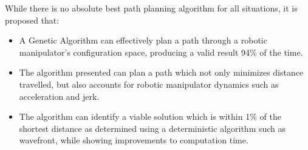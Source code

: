 While there is no absolute best path planning algorithm for all situations, it is proposed that:

\begin{itemize}
	\item A Genetic Algorithm can effectively plan a path through a robotic manipulator's configuration space, producing a valid result 94\% of the time.
	\item The algorithm presented can plan a path which not only minimizes distance travelled, but also accounts for robotic manipulator dynamics such as acceleration and jerk.
	\item The algorithm can identify a viable solution which is within 1\% of the shortest distance as determined using a deterministic algorithm such as wavefront, while showing improvements to computation time.
\end{itemize}

